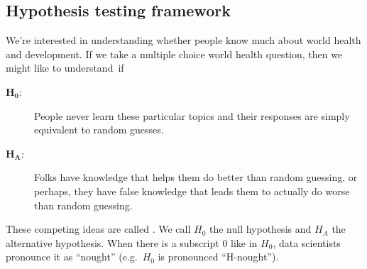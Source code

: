 %
%






\subsection{Hypothesis testing framework}

We're interested in understanding whether people know much
about world health and development. If we take a multiple choice
world health question, then we might like to understand~if
\begin{description}
\item[$\mathbf{H_0}$:]
    People never learn these particular topics and their
    responses are simply equivalent to random guesses.
\item[$\mathbf{H_A}$:]
    Folks have knowledge that helps them do better
    than random guessing, or perhaps, they have false knowledge
    that leads them to actually do worse than random guessing.
\end{description}
These competing ideas are called .
We call $H_0$ the null hypothesis and $H_A$ the alternative
hypothesis.
When there is a subscript 0 like in $H_0$,
data scientists pronounce it as ``nought''
(e.g.~$H_0$ is pronounced ``H-nought'').

